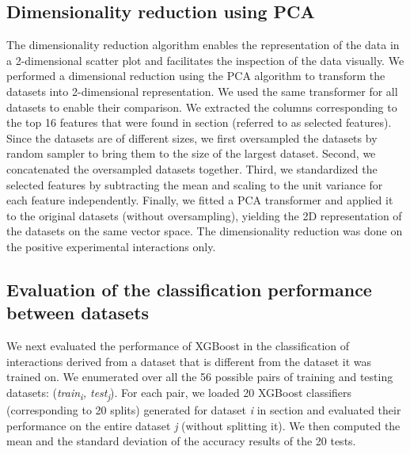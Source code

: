 \documentclass{bmcart}
\begin{document}
\subsection*{Dimensionality reduction using PCA}
The dimensionality reduction algorithm enables the representation of the data in a 2-dimensional scatter plot and facilitates the inspection of the data visually. We performed a dimensional reduction using the PCA algorithm to transform the datasets into 2-dimensional representation. 
We used the same transformer for all datasets to enable their comparison. 
We extracted the columns corresponding to the top 16 features that were found in section  (referred to as selected features). Since the datasets are of different sizes, we first oversampled the datasets by random sampler to bring them to the size of the largest dataset. Second, we concatenated the oversampled datasets together. Third, we standardized the selected features by subtracting the mean and scaling to the unit variance for each feature independently. Finally, we fitted a PCA transformer and applied it to the original datasets (without oversampling), yielding the 2D representation of the datasets on the same vector space. The dimensionality reduction was done on the positive experimental interactions only.

\subsection*{Evaluation of the classification performance between datasets}
We next evaluated the performance of XGBoost in the classification of interactions derived from a dataset that is different from the dataset it was trained on. We enumerated over all the 56 possible pairs of training and testing datasets: (\textit{train\textsubscript{i}, test\textsubscript{j}}). For each pair, we loaded 20 XGBoost classifiers (corresponding to 20 splits) generated for dataset \textit{i} in section  and evaluated their performance on the entire dataset \textit{j} (without splitting it). We then computed the mean and the standard deviation of the accuracy results of the 20 tests.




\end{document}
